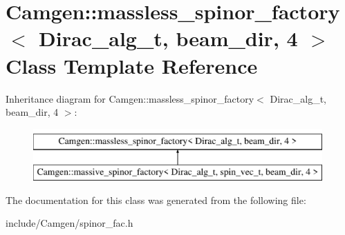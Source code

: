 \hypertarget{a00356}{\section{Camgen\-:\-:massless\-\_\-spinor\-\_\-factory$<$ Dirac\-\_\-alg\-\_\-t, beam\-\_\-dir, 4 $>$ Class Template Reference}
\label{a00356}
}
Inheritance diagram for Camgen\-:\-:massless\-\_\-spinor\-\_\-factory$<$ Dirac\-\_\-alg\-\_\-t, beam\-\_\-dir, 4 $>$\-:\begin{figure}[H]
\begin{center}
\leavevmode
\includegraphics[height=2.000000cm]{a00356}
\end{center}
\end{figure}


The documentation for this class was generated from the following file\-:\begin{DoxyCompactItemize}
\item 
include/\-Camgen/spinor\-\_\-fac.\-h\end{DoxyCompactItemize}
